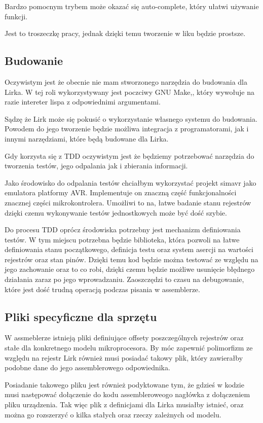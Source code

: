 \documentclass[11pt]{article}
\begin{document}
Bardzo pomocnym trybem może okazać się auto-complete,  który ułatwi używanie funkcji.

Jest to troszeczkę pracy, jednak dzięki temu tworzenie w liku będzie prostsze.
\subsection{Budowanie}
Oczywistym jest że obecnie nie mam stworzonego narzędzia do budowania dla Lirka. W tej roli wykorzystywany jest poczciwy GNU Make,,  który wywołuje na razie intereter lispa z odpowiednimi argumentami.

Sądzę że Lirk może się pokusić o wykorzystanie własnego systemu do budowania. Powodem do jego tworzenie będzie możliwa integracja z programatorami, jak i innymi narzędziami,  które będą budowane dla Lirka. 

Gdy korzysta się z TDD oczywistym jest że będziemy potrzebować narzędzia do tworzenia testów, jego odpalania jak i zbierania informacji.

Jako środowisko do odpalania testów chciałbym wykorzystać projekt simavr jako emulatora platformy AVR. 
Implementuje on znaczną część funkcjonalności znacznej części mikrokontrolera. Umożliwi to na, łatwe badanie stanu rejestrów dzięki czemu wykonywanie testów jednostkowych może być dość szybie.

Do procesu TDD oprócz środowiska potrzebny jest mechanizm definiowania testów. W tym miejscu potrzebna będzie biblioteka,  która pozwoli na łatwe definiowania stanu początkowego,
definicja testu oraz system asercji na wartości rejestrów oraz stan pinów. Dzięki temu kod będzie można testować ze względu na jego zachowanie oraz to co robi, dzięki czemu będzie możliwe usunięcie błędnego działania zaraz po jego wprowadzaniu. Zaoszczędzi to czasu na debugowanie,  które jest dość trudną operacją podczas pisania w assemblerze.

\subsection{Pliki specyficzne dla sprzętu}
 W assmeblerze istnieją pliki definiujące offsety poszczególnych rejestrów oraz stałe dla konkretnego modelu mikroprocesora. By móc zapewnić polimorfizm ze względu na rejestr Lirk również musi posiadać takowy plik,  który zawierałby podobne dane do jego assemblerowego odpowiednika.
 
Posiadanie takowego pliku jest również podyktowane tym, że gdzieś w kodzie musi następować dołączenie do kodu assembleroweogo nagłówka z dołączeniem pliku urządzenia. Tak więc plik z definicjami dla Lirka musiałby istnieć, oraz można go rozszerzyć o kilka stałych oraz rzeczy zależnych od modelu.
\end{document}
